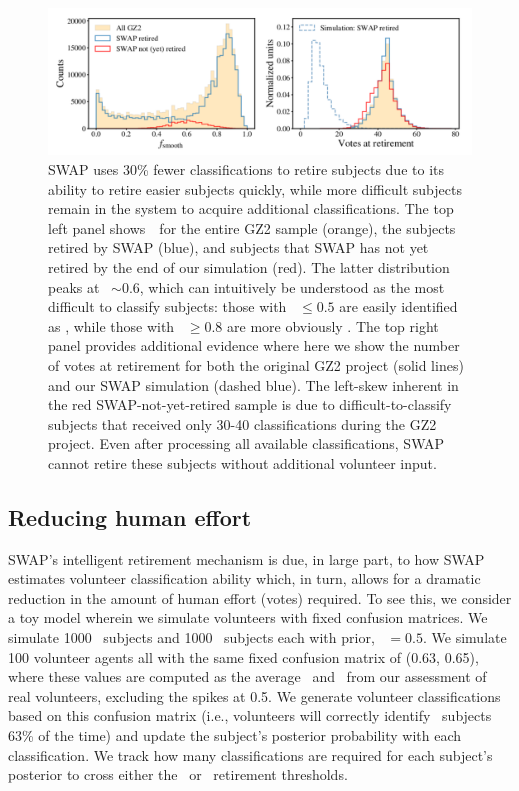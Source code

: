 \begin{figure}
\includegraphics[width=\linewidth]{Figures/human_machine/f14.pdf}
\caption[SWAP increase classification efficiency by retiring ``easy'' galaxies quickly.]{SWAP uses 30\% fewer classifications to retire subjects due to its ability to retire easier subjects quickly, while more difficult subjects remain in the system to acquire additional classifications. The top left panel shows~\fsmooth~for the entire GZ2 sample (orange), the subjects retired by SWAP (blue), and subjects that SWAP has not yet retired by the end of our simulation (red). The latter distribution peaks at \fsmooth~$\sim 0.6$, which can intuitively be understood as the most difficult to classify subjects: those with \fsmooth~$\le 0.5$ are easily identified as \feat, while those with \fsmooth~$\ge 0.8$ are more obviously \notfeat. The top right panel provides additional evidence where here we show the number of votes at retirement for both the original GZ2 project (solid lines) and our SWAP simulation (dashed blue). The left-skew inherent in the red SWAP-not-yet-retired sample is due to difficult-to-classify subjects that received only 30-40 classifications during the GZ2 project. Even after processing all available classifications, SWAP cannot retire these subjects without additional volunteer input.}
\label{fig: swap retirement}
\end{figure}



\subsection{Reducing human effort}
SWAP's intelligent retirement mechanism is due, in large part, to how SWAP estimates volunteer classification ability which, in turn, allows for a dramatic reduction in the amount of human effort (votes) required. To see this, we consider a toy model wherein we simulate volunteers with fixed confusion matrices. We simulate 1000 \feat~subjects and 1000 \notfeat~subjects each with prior, \p~$ = 0.5$. We simulate 100 volunteer agents all with the same fixed confusion matrix of (0.63, 0.65), where these values are computed as the average \Pf~and \Pn~from our assessment of real volunteers, excluding the spikes at 0.5. We generate volunteer classifications based on this confusion matrix (i.e., volunteers will correctly identify \feat~subjects 63\% of the time) and update the subject's posterior probability with each classification. We track how many classifications are required for each subject's posterior to cross either the \feat~or \notfeat~retirement thresholds. 



